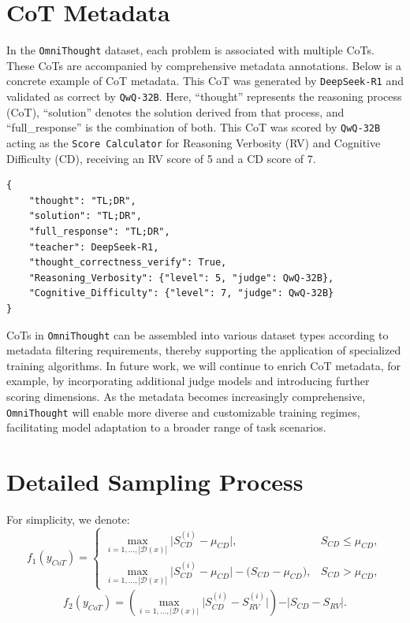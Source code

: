 \documentclass{article}
\begin{document}
\appendix

\section{CoT Metadata}


\label{sec:metadata}

In the \texttt{OmniThought} dataset, each problem is associated with multiple CoTs. These CoTs are accompanied by comprehensive metadata annotations. Below is a concrete example of CoT metadata. This CoT was generated by \texttt{DeepSeek-R1} and validated as correct by \texttt{QwQ-32B}. Here, ``thought'' represents the reasoning process (CoT), ``solution'' denotes the solution derived from that process, and ``full\_response'' is the combination of both. This CoT was scored by \texttt{QwQ-32B} acting as the \texttt{Score Calculator} for Reasoning Verbosity (RV) and Cognitive Difficulty (CD), receiving an RV score of 5 and a CD score of 7.

\begin{verbatim}
{
    "thought": "TL;DR",
    "solution": "TL;DR",
    "full_response": "TL;DR",
    "teacher": DeepSeek-R1,
    "thought_correctness_verify": True,
    "Reasoning_Verbosity": {"level": 5, "judge": QwQ-32B},
    "Cognitive_Difficulty": {"level": 7, "judge": QwQ-32B}
}
\end{verbatim}

CoTs in \texttt{OmniThought} can be assembled into various dataset types according to metadata filtering requirements, thereby supporting the application of specialized training algorithms. In future work, we will continue to enrich CoT metadata, for example, by incorporating additional judge models and introducing further scoring dimensions. As the metadata becomes increasingly comprehensive, \texttt{OmniThought} will enable more diverse and customizable training regimes, facilitating model adaptation to a broader range of task scenarios.

\section{Detailed Sampling Process}


\label{sec:sample}

For simplicity, we denote:
\begin{equation}
f_1(y_{CoT})= 
\begin{cases}
\max_{i=1,\ldots,|\mathcal{D}(x)|}\bigl\lvert S^{(i)}_{CD}-\mu_{CD}\bigr\rvert, & S_{CD}\le\mu_{CD},\\[0.5em]
\max_{i=1,\ldots,|\mathcal{D}(x)|}\bigl\lvert S^{(i)}_{CD}-\mu_{CD}\bigr\rvert - \bigl(S_{CD}-\mu_{CD}\bigr), & S_{CD}>\mu_{CD},
\end{cases}
\end{equation}
\begin{equation}
f_2(y_{CoT})=\left(\max_{i=1,\ldots,\vert\mathcal{D}(x)\vert}\vert S^{(i)}_{CD}-S^{(i)}_{RV}\vert\right) - \vert S_{CD}-S_{RV}\vert.
\end{equation}
\end{document}
